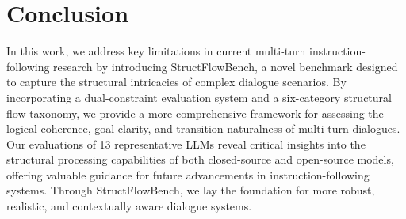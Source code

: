 \section{Conclusion}

In this work, we address key limitations in current multi-turn instruction-following research by introducing StructFlowBench, a novel benchmark designed to capture the structural intricacies of complex dialogue scenarios.
By incorporating a dual-constraint evaluation system and a six-category structural flow taxonomy, we provide a more comprehensive framework for assessing the logical coherence, goal clarity, and transition naturalness of multi-turn dialogues. 
Our evaluations of 13 representative LLMs reveal critical insights into the structural processing capabilities of both closed-source and open-source models, offering valuable guidance for future advancements in instruction-following systems. 
Through StructFlowBench, we lay the foundation for more robust, realistic, and contextually aware dialogue systems.